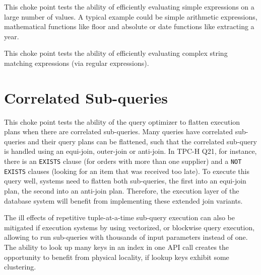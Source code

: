 

This choke point tests the ability of efficiently evaluating simple expressions on a large number of values. A typical example could be simple arithmetic expressions, mathematical functions like floor and absolute or date functions like extracting a year.





This choke point tests the ability of efficiently evaluating complex string
matching expressions (\eg via regular expressions).

%


\section{Correlated Sub-queries}



This choke point tests the ability of the query optimizer to flatten execution plans when there are correlated sub-queries. Many queries have correlated sub-queries and their query plans can be flattened,
such that the correlated sub-query is handled using an equi-join, outer-join or anti-join.
In TPC-H Q21, for instance, there is an \lstinline{EXISTS} clause (for orders with more than one supplier) and a \lstinline{NOT EXISTS} clauses (looking for an item that was received too late).
To execute this query well, systems need to flatten both sub-queries, the first into an equi-join plan, the second into an anti-join plan.
Therefore, the execution layer of the database system will benefit from implementing these extended join variants.

The ill effects of repetitive tuple-at-a-time sub-query execution can also be mitigated if execution systems by using vectorized, or blockwise query execution, allowing to run sub-queries with thousands of input parameters instead of one.
The ability to look up many keys in an index in one API call creates the opportunity to benefit from physical locality, if lookup keys exhibit some clustering.

